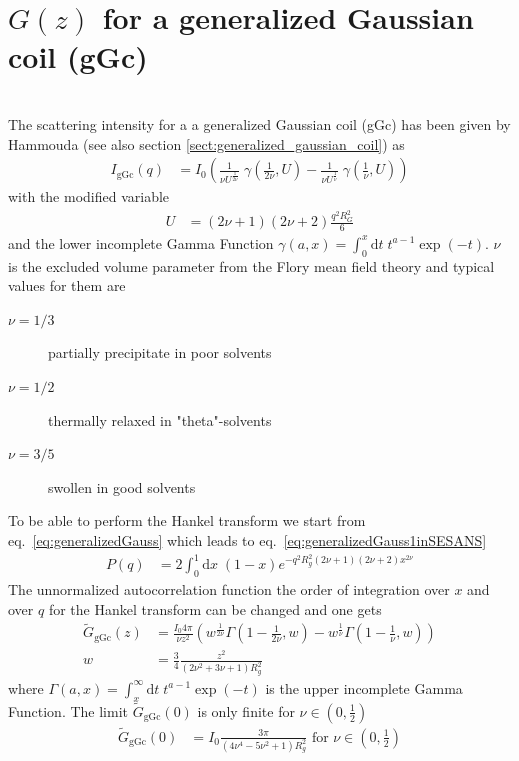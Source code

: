 \section{$G(z)$ for a generalized Gaussian coil (gGc) }~\\
The scattering intensity for a a generalized Gaussian coil (gGc) has been given by  Hammouda \cite{Hammouda,Hammouda2012,Hammouda1993,Hammouda2016} (see also section \ref{sect:generalized_gaussian_coil}) as
\begin{align}
I_\text{gGc}(q) &= I_0
\left(
\frac{1}{\nu U^{\frac{1}{2 \nu}}} \; \gamma\left(\frac{1}{2 \nu},U\right)-
\frac{1}{\nu U^{\frac{1}{  \nu}}} \; \gamma\left(\frac{1}{  \nu},U\right)
\right)
\label{eq:generalizedGauss1inSESANS}
\end{align}
with the modified variable
\begin{align}
U&= \left(2\nu+1\right)\left(2\nu+2\right)\frac{q^2R_G^2}{6}
\end{align}
and the lower incomplete Gamma Function $\gamma(a,x) = \int_0^x \mathrm{d}t \; t^{a-1} \exp(-t)$.
$\nu$ is the excluded volume parameter from the Flory mean field theory and typical values for them are
\begin{description}
\item[$\nu=1/3$] partially precipitate in poor solvents
\item[$\nu=1/2$] thermally relaxed in "theta"-solvents
\item[$\nu=3/5$] swollen in good solvents
\end{description}
To be able to perform the Hankel transform we start from eq.\ \ref{eq:generalizedGauss} which leads to eq.\ \ref{eq:generalizedGauss1inSESANS}
\begin{align}
P(q) &= 2\int_0^1 \mathrm{d}x \; (1-x)e^{-q^2R_g^2(2\nu+1)(2\nu+2)x^{2\nu}}
\label{eq:generalizedGaussinSESANS}
\end{align}
The unnormalized autocorrelation function the order of integration over $x$ and  over $q$ for the Hankel transform can be changed and one gets
\begin{align}
\tilde{G}_\mathrm{gGc}(z) &=
 \frac{I_0 4\pi}{\nu z^2} \left(
   w^{\frac{1}{2\nu}} \Gamma \left(1-\frac{1}{2 \nu },w\right) - w^{\frac{1}{\nu }} \Gamma \left(1-\frac{1}{\nu },w\right) \right)\\
   w &= \frac34 \frac{z^2}{\left(2 \nu ^2+3 \nu +1\right) R_g^2}
\end{align}
where $\Gamma(a,x) = \int_x^\infty \mathrm{d}t \; t^{a-1} \exp(-t)$ is the upper incomplete Gamma Function.
The limit $\tilde{G}_\mathrm{gGc}(0)$ is only finite for $\nu \in \left(0,\frac12\right)$
\begin{align}
\tilde{G}_\mathrm{gGc}(0) &= I_0 \frac{3 \pi }{\left(4 \nu ^4-5 \nu ^2+1\right) R_g^2} \mbox{~for~} \nu \in \left(0,\frac12\right)
\end{align} 